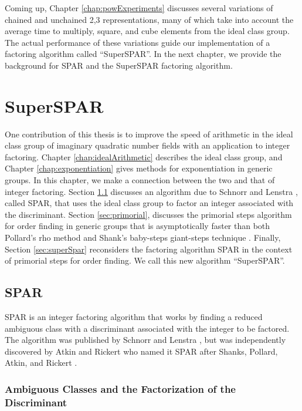 \documentclass{ucalgthes1}
\theoremstyle{definition}
\begin{document}
Coming up, Chapter \ref{chap:powExperiments} discusses several variations of chained and unchained 2,3 representations, many of which take into account the average time to multiply, square, and cube elements from the ideal class group.  The actual performance of these variations guide our implementation of a factoring algorithm called ``SuperSPAR''.  In the next chapter, we provide the background for SPAR and the SuperSPAR factoring algorithm.


\chapter{SuperSPAR}
\label{chap:superspar}

One contribution of this thesis is to improve the speed of arithmetic in the ideal class group of imaginary quadratic number fields with an application to integer factoring.  Chapter \ref{chap:idealArithmetic} describes the ideal class group, and Chapter \ref{chap:exponentiation} gives methods for exponentiation in generic groups.  In this chapter, we make a connection between the two and that of integer factoring.  Section \ref{sec:spar} discusses an algorithm due to Schnorr and Lenstra \cite{Schnorr1984}, called SPAR, that uses the ideal class group to factor an integer associated with the discriminant.  Section \ref{sec:primorial}, discusses the primorial steps algorithm for order finding in generic groups that is asymptotically faster than both Pollard's rho method \cite{Pollard1975} and Shank's baby-steps giant-steps technique \cite{Shanks1971}.  Finally, Section \ref{sec:superSpar} reconsiders the factoring algorithm SPAR in the context of primorial steps for order finding.  We call this new algorithm ``SuperSPAR''.

\section{SPAR}
\label{sec:spar}

SPAR is an integer factoring algorithm that works by finding a reduced ambiguous class with a discriminant associated with the integer to be factored.  The algorithm was published by Schnorr and Lenstra \cite{Schnorr1984}, but was independently discovered by Atkin and Rickert who named it SPAR after Shanks, Pollard, Atkin, and Rickert \cite[p.182]{Jacobson1999}.

\subsection{Ambiguous Classes and the Factorization of the Discriminant}
\label{subsec:forms}
\end{document}
